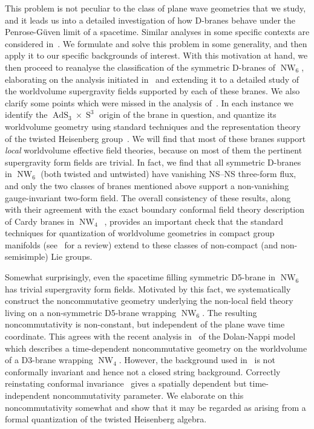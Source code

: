 \documentclass[11pt,a4paper]{article}
\DeclareMathOperator{\AdS}{AdS}
\DeclareMathOperator{\Sphere}{S}
\DeclareMathOperator{\NW}{NW}
\let\S\Sphere
\begin{document}
This problem is not peculiar to the class of plane wave geometries
that we study, and it leads us into a detailed investigation of how
D-branes behave under the Penrose-G\"uven limit of a
spacetime. Similar analyses in some specific contexts are considered
in~\cite{DK2,SZ1,SF1}. We formulate and solve this problem in some
generality, and then apply it to our specific backgrounds of
interest. With this motivation at hand, we then proceed to reanalyse
the classification of the symmetric D-branes of $\NW_6$, elaborating
on the analysis initiated in~\cite{FS1,SF1} and extending it to a
detailed study of the worldvolume supergravity fields supported by
each of these branes. We also clarify some points which were missed
in the analysis of~\cite{SF1}. In each instance we identify the
$\AdS_3\times\S^3$ origin of the brane in question, and quantize its
worldvolume geometry using standard techniques and the representation
theory of the twisted Heisenberg
group~\cite{BAKZ1,CFS1,KK1,Streater1}. We will find that most of
these branes support {\it local} worldvolume effective field theories,
because on most of them the pertinent supergravity form fields
are trivial. In fact, we find that all symmetric D-branes in $\NW_6$
(both twisted and untwisted) have vanishing NS--NS three-form flux,
and only the two classes of branes mentioned above support a
non-vanishing gauge-invariant two-form field. The overall consistency
of these results, along with their agreement with the exact boundary
conformal field theory description of Cardy branes in
$\NW_4$~\cite{DK2}, provides an important check that the standard
techniques for quantization of worldvolume geometries in compact group
manifolds (see~\cite{Schom1} for a review) extend to these classes of
non-compact (and non-semisimple) Lie groups.

Somewhat surprisingly, even the spacetime filling symmetric D5-brane
in $\NW_6$ has trivial supergravity form fields. Motivated by this fact, we
systematically construct the noncommutative geometry underlying
the non-local field theory living on a non-symmetric D5-brane wrapping
$\NW_6$. The resulting noncommutativity is non-constant, but
independent of the plane wave time coordinate. This agrees with the
recent analysis in~\cite{HT1} of the Dolan-Nappi model~\cite{DN1}
which describes a time-dependent noncommutative geometry on the
worldvolume of a D3-brane wrapping $\NW_4$. However, the background
used in~\cite{DN1} is not conformally invariant and hence not a closed string
background. Correctly reinstating conformal invariance~\cite{HT1}
gives a spatially dependent but time-independent noncommutativity
parameter. We elaborate on this noncommutativity somewhat and show
that it may be regarded as arising from a formal quantization of the
twisted Heisenberg algebra.
\end{document}

